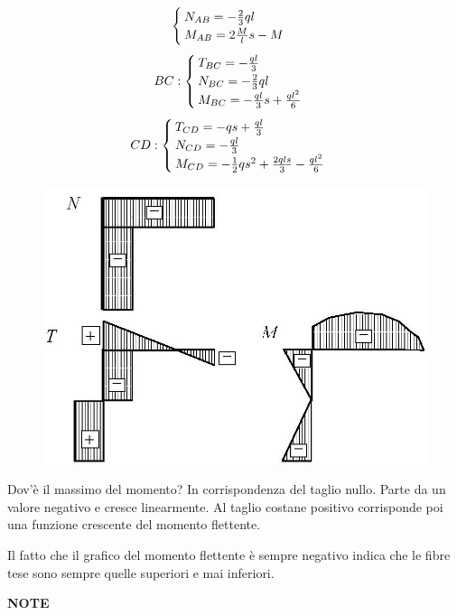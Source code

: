 \documentclass{article}
\begin{document}
\begin{adjustwidth}{2in}{}
\[\begin{cases}
		N_{AB} = -{2\over3}ql \\
		
		M_{AB} =  2{M\over l}s -M
	\end{cases}
	\] \hspace{0.5cm}
	\[
	BC: \begin{cases}
		T_{BC} = -{ql\over 3} \\
		
		N_{BC} = -{2\over3}ql \\
		
		M_{BC} =  -{ql\over 3}s+{ql^2\over 6}
	\end{cases}
	\]
	\hspace{0.5cm}
	\[
	CD: \begin{cases}
		T_{CD} = -qs+{ql\over 3} \\
		
		N_{CD} = -{ql\over 3} \\
		
		M_{CD} =  -{1\over2}qs^2+{2qls\over 3} -{ql^2\over6}
	\end{cases}
	\]
	\begin{figure}[H]
		\centering
		\includegraphics[width=0.3\linewidth]{"immagini/1.PARTE5_Pagina_27"}
	\end{figure}
	Dov'è il massimo del momento? In corrispondenza del taglio nullo. Parte da un valore negativo e cresce linearmente. Al taglio costane positivo corrisponde poi una funzione crescente del momento flettente. 
	
	Il fatto che il grafico del momento flettente è sempre negativo indica che le fibre tese sono sempre quelle superiori e mai inferiori. 
	
	
	\newpage
	\textbf{\LARGE NOTE}
	
	
	
	
	
\end{adjustwidth}
\end{document}
